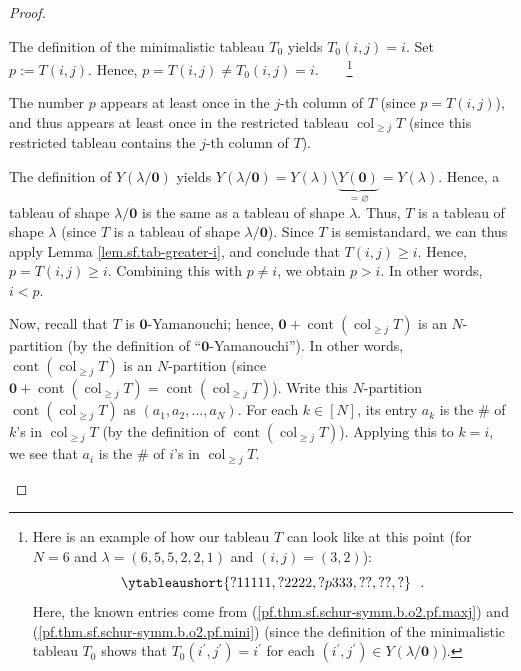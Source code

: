 \begin{proof}
\begin{fineprint}
The definition of the minimalistic tableau $T_{0}$ yields $T_{0}\left(
i,j\right)  =i$. Set $p:=T\left(  i,j\right)  $. Hence, $p=T\left(
i,j\right)  \neq T_{0}\left(  i,j\right)  =i$.\ \ \ \ \footnote{Here is an
example of how our tableau $T$ can look like at this point (for $N=6$ and
$\lambda=\left(  6,5,5,2,2,1\right)  $ and $\left(  i,j\right)  =\left(
3,2\right)  $):%
\[
\ytableaushort{?11111,?2222,?p333,??,??,?}\ \ .
\]
Here, the known entries come from (\ref{pf.thm.sf.schur-symm.b.o2.pf.maxj})
and (\ref{pf.thm.sf.schur-symm.b.o2.pf.mini}) (since the definition of the
minimalistic tableau $T_{0}$ shows that $T_{0}\left(  i^{\prime},j^{\prime
}\right)  =i^{\prime}$ for each $\left(  i^{\prime},j^{\prime}\right)  \in
Y\left(  \lambda/\mathbf{0}\right)  $).}

The number $p$ appears at least once in the $j$-th column of $T$ (since
$p=T\left(  i,j\right)  $), and thus appears at least once in the restricted
tableau $\operatorname{col}_{\geq j}T$ (since this restricted tableau contains
the $j$-th column of $T$).

The definition of $Y\left(  \lambda/\mathbf{0}\right)  $ yields $Y\left(
\lambda/\mathbf{0}\right)  =Y\left(  \lambda\right)  \setminus
\underbrace{Y\left(  \mathbf{0}\right)  }_{=\varnothing}=Y\left(
\lambda\right)  $. Hence, a tableau of shape $\lambda/\mathbf{0}$ is the same
as a tableau of shape $\lambda$. Thus, $T$ is a tableau of shape $\lambda$
(since $T$ is a tableau of shape $\lambda/\mathbf{0}$). Since $T$ is
semistandard, we can thus apply Lemma \ref{lem.sf.tab-greater-i}, and conclude
that $T\left(  i,j\right)  \geq i$. Hence, $p=T\left(  i,j\right)  \geq i$.
Combining this with $p\neq i$, we obtain $p>i$. In other words, $i<p$.

Now, recall that $T$ is $\mathbf{0}$-Yamanouchi; hence, $\mathbf{0}%
+\operatorname*{cont}\left(  \operatorname{col}_{\geq j}T\right)  $ is an
$N$-partition (by the definition of \textquotedblleft$\mathbf{0}%
$-Yamanouchi\textquotedblright). In other words, $\operatorname*{cont}\left(
\operatorname{col}_{\geq j}T\right)  $ is an $N$-partition (since
$\mathbf{0}+\operatorname*{cont}\left(  \operatorname{col}_{\geq j}T\right)
=\operatorname*{cont}\left(  \operatorname{col}_{\geq j}T\right)  $). Write
this $N$-partition $\operatorname*{cont}\left(  \operatorname{col}_{\geq
j}T\right)  $ as $\left(  a_{1},a_{2},\ldots,a_{N}\right)  $. For each
$k\in\left[  N\right]  $, its entry $a_{k}$ is the \# of $k$'s in
$\operatorname{col}_{\geq j}T$ (by the definition of $\operatorname*{cont}%
\left(  \operatorname{col}_{\geq j}T\right)  $). Applying this to $k=i$, we
see that $a_{i}$ is the \# of $i$'s in $\operatorname{col}_{\geq j}T$.


\end{fineprint}
\end{proof}
